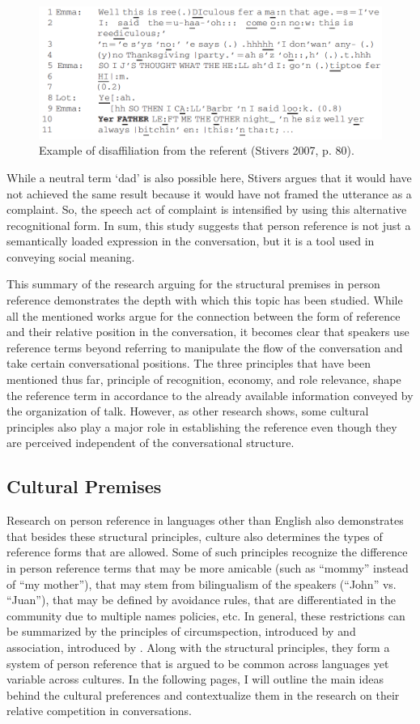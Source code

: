\documentclass[12pt, draft]{article}
\begin{document}
\begin{figure}[h]
\caption{Example of disaffiliation from the referent (Stivers 2007, p. 80).}
\label{stivers}
\includegraphics[width=5in]{stivers.png}
\end{figure}
While a neutral term `dad' is also possible here, Stivers argues that it would have not achieved the same result because it would have not framed the utterance as a complaint. So, the speech act of complaint is intensified by using this alternative recognitional form. In sum, this study suggests that person reference is not just a semantically loaded expression in the conversation, but it is a tool used in conveying social meaning. 

This summary of the research arguing for the structural premises in person reference demonstrates the depth with which this topic has been studied. While all the mentioned works argue for the connection between the form of reference and their relative position in the conversation, it becomes clear that speakers use reference terms beyond referring to manipulate the flow of the conversation and take certain conversational positions. The three principles that have been mentioned thus far, principle of recognition, economy, and role relevance, shape the reference term in accordance to the already available information conveyed by the organization of talk. However, as other research shows, some cultural principles also play a major role in establishing the reference even though they are perceived independent of the conversational structure. 
  
\subsection{Cultural Premises}
Research on person reference in languages other than English also demonstrates that besides these structural principles, culture also determines the types of reference forms that are allowed. Some of such principles recognize the difference in person reference terms that may be more amicable (such as ``mommy'' instead of ``my mother''), that may stem from bilingualism of the speakers (``John'' vs. ``Juan''), that may be defined by avoidance rules, that are differentiated in the community due to multiple names policies, etc. In general, these restrictions can be summarized by the principles of circumspection, introduced by \textcite{levinson2007} and association, introduced by \textcite{brown2007}. Along with the structural principles, they form a system of person reference that is argued to be common across languages yet variable across cultures. In the following pages, I will outline the main ideas behind the cultural preferences and contextualize them in the research on their relative competition in conversations.  
\end{document}
